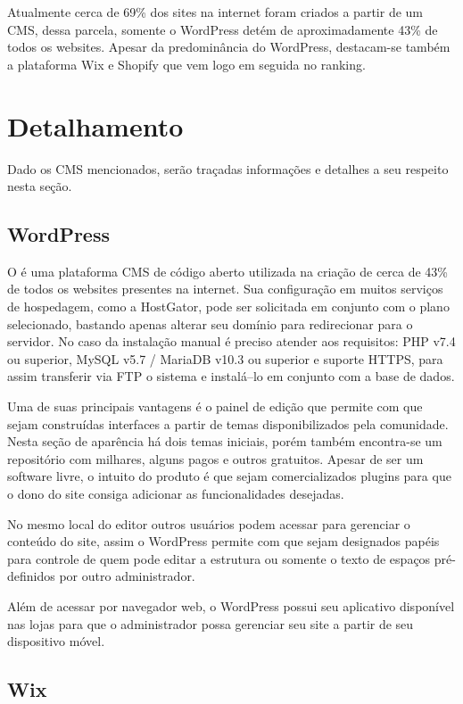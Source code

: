 Atualmente cerca de 69\% dos sites na internet foram criados a partir de um CMS, dessa parcela, somente o WordPress detém de aproximadamente 43\% de todos os websites. Apesar da predominância do WordPress, destacam-se também a plataforma Wix e Shopify que vem logo em seguida no ranking.

\section{Detalhamento}

Dado os CMS mencionados, serão traçadas informações e detalhes a seu respeito nesta seção.

\subsection{WordPress}

O  é uma plataforma CMS de código aberto utilizada na criação de cerca de 43\% de todos os websites presentes na internet. Sua configuração em muitos serviços de hospedagem, como a HostGator, pode ser solicitada em conjunto com o plano selecionado, bastando apenas alterar seu domínio para redirecionar para o servidor. No caso da instalação manual é preciso atender aos requisitos: PHP v7.4 ou superior, MySQL v5.7 / MariaDB v10.3 ou superior e suporte HTTPS, para assim transferir via FTP o sistema e instalá–lo em conjunto com a base de dados.

Uma de suas principais vantagens é o painel de edição que permite com que sejam construídas interfaces a partir de temas disponibilizados pela comunidade. Nesta seção de aparência há dois temas iniciais, porém também encontra-se um repositório com milhares, alguns pagos e outros gratuitos. Apesar de ser um software livre, o intuito do produto é que sejam comercializados plugins para que o dono do site consiga adicionar as funcionalidades desejadas.

No mesmo local do editor outros usuários podem acessar para gerenciar o conteúdo do site, assim o WordPress permite com que sejam designados papéis para controle de quem pode editar a estrutura ou somente o texto de espaços pré-definidos por outro administrador.

Além de acessar por navegador web, o WordPress possui seu aplicativo disponível nas lojas para que o administrador possa gerenciar seu site a partir de seu dispositivo móvel.

\subsection{Wix}

